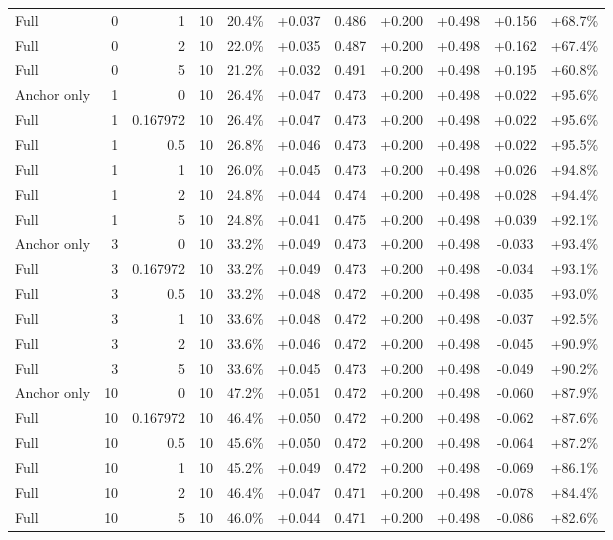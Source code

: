 \begin{table}[htbp]
\begin{tabular}{lrrrccccccc}
Full & 0 & 1 & 10 & 20.4\% & +0.037 & 0.486 & +0.200 & +0.498 & +0.156 & +68.7\% \\
Full & 0 & 2 & 10 & 22.0\% & +0.035 & 0.487 & +0.200 & +0.498 & +0.162 & +67.4\% \\
Full & 0 & 5 & 10 & 21.2\% & +0.032 & 0.491 & +0.200 & +0.498 & +0.195 & +60.8\% \\
Anchor only & 1 & 0 & 10 & 26.4\% & +0.047 & 0.473 & +0.200 & +0.498 & +0.022 & +95.6\% \\
Full & 1 & 0.167972 & 10 & 26.4\% & +0.047 & 0.473 & +0.200 & +0.498 & +0.022 & +95.6\% \\
Full & 1 & 0.5 & 10 & 26.8\% & +0.046 & 0.473 & +0.200 & +0.498 & +0.022 & +95.5\% \\
Full & 1 & 1 & 10 & 26.0\% & +0.045 & 0.473 & +0.200 & +0.498 & +0.026 & +94.8\% \\
Full & 1 & 2 & 10 & 24.8\% & +0.044 & 0.474 & +0.200 & +0.498 & +0.028 & +94.4\% \\
Full & 1 & 5 & 10 & 24.8\% & +0.041 & 0.475 & +0.200 & +0.498 & +0.039 & +92.1\% \\
Anchor only & 3 & 0 & 10 & 33.2\% & +0.049 & 0.473 & +0.200 & +0.498 & -0.033 & +93.4\% \\
Full & 3 & 0.167972 & 10 & 33.2\% & +0.049 & 0.473 & +0.200 & +0.498 & -0.034 & +93.1\% \\
Full & 3 & 0.5 & 10 & 33.2\% & +0.048 & 0.472 & +0.200 & +0.498 & -0.035 & +93.0\% \\
Full & 3 & 1 & 10 & 33.6\% & +0.048 & 0.472 & +0.200 & +0.498 & -0.037 & +92.5\% \\
Full & 3 & 2 & 10 & 33.6\% & +0.046 & 0.472 & +0.200 & +0.498 & -0.045 & +90.9\% \\
Full & 3 & 5 & 10 & 33.6\% & +0.045 & 0.473 & +0.200 & +0.498 & -0.049 & +90.2\% \\
Anchor only & 10 & 0 & 10 & 47.2\% & +0.051 & 0.472 & +0.200 & +0.498 & -0.060 & +87.9\% \\
Full & 10 & 0.167972 & 10 & 46.4\% & +0.050 & 0.472 & +0.200 & +0.498 & -0.062 & +87.6\% \\
Full & 10 & 0.5 & 10 & 45.6\% & +0.050 & 0.472 & +0.200 & +0.498 & -0.064 & +87.2\% \\
Full & 10 & 1 & 10 & 45.2\% & +0.049 & 0.472 & +0.200 & +0.498 & -0.069 & +86.1\% \\
Full & 10 & 2 & 10 & 46.4\% & +0.047 & 0.471 & +0.200 & +0.498 & -0.078 & +84.4\% \\
Full & 10 & 5 & 10 & 46.0\% & +0.044 & 0.471 & +0.200 & +0.498 & -0.086 & +82.6\% \\

\end{tabular}
\end{table}

